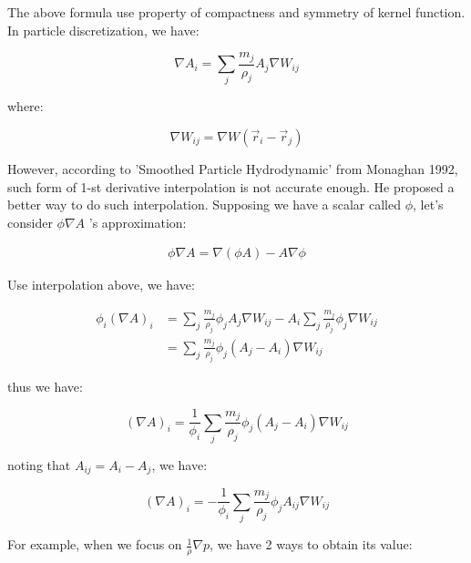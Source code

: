 \documentclass[10pt, oneside]{article}
\begin{document}
The above formula use property of compactness and symmetry of kernel function. 
In particle discretization, we have:

\begin{equation}
    \nabla A_i = \sum_{j} \frac{m_j}{\rho_j} A_j \nabla W_{ij}
\end{equation}

where:

\begin{equation}
    \nabla W_{ij} = \nabla W(\vec{r}_i - \vec{r}_j)
\end{equation}

However, according to 'Smoothed Particle Hydrodynamic' from Monaghan 1992, 
such form of 1-st derivative interpolation is not accurate enough. 
He proposed a better way to do such interpolation. 
Supposing we have a scalar called $\phi$, let's consider $\phi\nabla A$ 's approximation:

\begin{equation}
    \begin{aligned}
        \phi\nabla A = \nabla(\phi A) - A\nabla\phi
    \end{aligned}
\end{equation}

Use interpolation above, we have:

\begin{equation}
    \begin{aligned}
        \phi_i (\nabla A)_i &= 
            \sum_j \frac{m_j}{\rho_j} \phi_j A_j \nabla W_{ij} -
            A_i\sum_j \frac{m_j}{\rho_j}  \phi_j \nabla W_{ij}\\
            &= \sum_j \frac{m_j}{\rho_j} \phi_j( A_j-A_i) \nabla W_{ij}
    \end{aligned}
\end{equation}

thus we have:

\begin{equation}
    (\nabla A)_i = \frac{1}{\phi_i}\sum_j \frac{m_j}{\rho_j} \phi_j( A_j-A_i) \nabla W_{ij} 
\end{equation}

noting that $A_{ij} = A_i - A_j$, we have:

\begin{equation}
    (\nabla A)_i = -\frac{1}{\phi_i}\sum_j \frac{m_j}{\rho_j}\phi_j A_{ij} \nabla W_{ij}
\end{equation}

For example, when we focus on $\frac{1}{\rho}\nabla p$, 
we have 2 ways to obtain its value:
\end{document}
